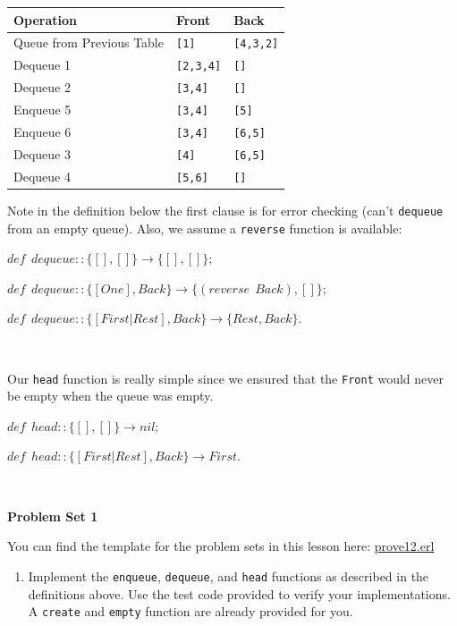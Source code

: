 \documentclass[
]{book}
\providecommand{\tightlist}{%
  \setlength{\itemsep}{0pt}\setlength{\parskip}{0pt}}
\begin{document}
\begin{longtable}[]{@{}lll@{}}
\toprule
Operation & Front & Back \\
\midrule
\endhead
Queue from Previous Table & \texttt{{[}1{]}} & \texttt{{[}4,3,2{]}} \\
Dequeue 1 & \texttt{{[}2,3,4{]}} & \texttt{{[}{]}} \\
Dequeue 2 & \texttt{{[}3,4{]}} & \texttt{{[}{]}} \\
Enqueue 5 & \texttt{{[}3,4{]}} & \texttt{{[}5{]}} \\
Enqueue 6 & \texttt{{[}3,4{]}} & \texttt{{[}6,5{]}} \\
Dequeue 3 & \texttt{{[}4{]}} & \texttt{{[}6,5{]}} \\
Dequeue 4 & \texttt{{[}5,6{]}} & \texttt{{[}{]}} \\
\bottomrule
\end{longtable}

Note in the definition below the first clause is for error checking (can't \texttt{dequeue} from an empty queue). Also, we assume a \texttt{reverse} function is available:

\begin{formulabox}
\(de\mathit{f} ~ ~ dequeue :: \lbrace [], [] \rbrace \rightarrow \lbrace [], [] \rbrace;\)

\(de\mathit{f} ~ ~ dequeue :: \lbrace [One], Back \rbrace \rightarrow \lbrace (reverse ~ ~ Back), [] \rbrace;\)

\(de\mathit{f} ~ ~ dequeue :: \lbrace [First|Rest], Back \rbrace \rightarrow \lbrace Rest, Back \rbrace.\)

\end{formulabox}

\(\nonumber\)

Our \texttt{head} function is really simple since we ensured that the \texttt{Front} would never be empty when the queue was empty.

\begin{formulabox}
\(de\mathit{f} ~ ~ head :: \lbrace [], [] \rbrace \rightarrow nil;\)

\(de\mathit{f} ~ ~ head :: \lbrace [First|Rest], Back \rbrace \rightarrow First.\)

\end{formulabox}

\(\nonumber\)

\begin{problembox}

\textbf{Problem Set 1}

You can find the template for the problem sets in this lesson here: \href{proves/prove12.erl}{prove12.erl}

\begin{enumerate}
\def\labelenumi{\arabic{enumi}.}
\tightlist
\item
  Implement the \texttt{enqueue}, \texttt{dequeue}, and \texttt{head} functions as described in the definitions above. Use the test code provided to verify your implementations. A \texttt{create} and \texttt{empty} function are already provided for you.
\end{enumerate}

\end{problembox}
\end{document}
